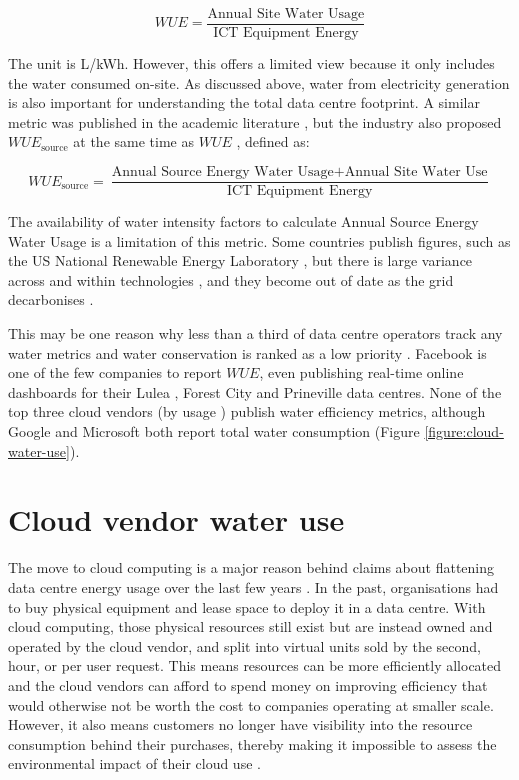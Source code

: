 \documentclass{article}
\begin{document}
\begin{equation}
    WUE = \frac{\textrm{Annual Site Water Usage}}{\textrm{ICT Equipment
    Energy}}
\end{equation}

The unit is L/kWh. However, this offers a limited view because it only includes
the water consumed on-site. As discussed above, water from electricity
generation is also important for understanding the total data centre footprint.
A similar metric was published in the academic literature
\cite{sharma_water_2009}, but the industry also proposed $WUE_\textrm{source}$
at the same time as $WUE$ \cite{patterson_water_2011}, defined as:

\begin{equation}
    WUE_\textrm{source} = \frac{\textrm{Annual Source Energy Water Usage}+
    \textrm{Annual Site Water Use}}{\textrm{ICT Equipment Energy}}
\end{equation}

The availability of water intensity factors to calculate Annual Source Energy
Water Usage is a limitation of this metric. Some countries publish figures,
such as the US National Renewable Energy Laboratory
\cite{torcellini_consumptive_2003}, but there is large variance across and
within technologies \cite{macknick_operational_2012}, and they become out of
date as the grid decarbonises \cite{peck_quantification_2017}.

This may be one reason why less than a third of data centre operators track any
water metrics and water conservation is ranked as a low priority
\cite{heslin_ignore_2016}. Facebook is one of the few companies to report
$WUE$, even publishing real-time online dashboards for their Lulea
\cite{facebook_lulea_2020}, Forest City \cite{facebook_forest_2020} and
Prineville \cite{facebook_prineville_2020} data centres. None of the top three
cloud vendors (by usage \cite{flexera_rightscale_2019}) publish water
efficiency metrics, although Google \cite{google_environmental_2020} and
Microsoft \cite{microsoft_2019_2020} both report total water consumption
(Figure \ref{figure:cloud-water-use}).

\section*{Cloud vendor water use}

The move to cloud computing is a major reason behind claims about flattening
data centre energy usage over the last few years
\cite{masanet_recalibrating_2020}. In the past, organisations had to buy
physical equipment and lease space to deploy it in a data centre. With cloud
computing, those physical resources still exist but are instead owned and
operated by the cloud vendor, and split into virtual units sold by the second,
hour, or per user request. This means resources can be more efficiently
allocated and the cloud vendors can afford to spend money on improving
efficiency that would otherwise not be worth the cost to companies operating at
smaller scale. However, it also means customers no longer have visibility into
the resource consumption behind their purchases, thereby making it impossible
to assess the environmental impact of their cloud use
\cite{mytton_assessing_2020}.
\end{document}
